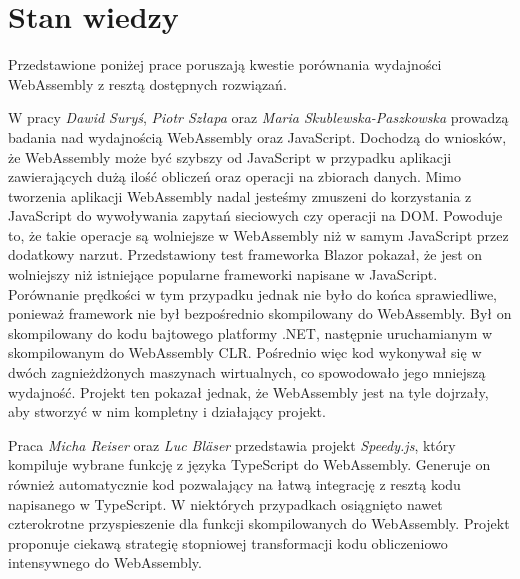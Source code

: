 \documentclass[language=polish,type=master]{aghmodern}
\begin{document}
\section{Stan wiedzy}
Przedstawione poniżej prace poruszają kwestie porównania wydajności WebAssembly z resztą dostępnych rozwiązań.

W pracy \cite{wasm_blazor} \emph{Dawid Suryś}, \emph{Piotr Szłapa} oraz \emph{Maria Skublewska-Paszkowska} prowadzą badania nad wydajnością WebAssembly oraz JavaScript.
Dochodzą do wniosków, że WebAssembly może być szybszy od JavaScript w przypadku aplikacji zawierających dużą ilość obliczeń oraz operacji na zbiorach danych.
Mimo tworzenia aplikacji WebAssembly nadal jesteśmy zmuszeni do korzystania z JavaScript do wywoływania zapytań sieciowych czy operacji na DOM\footnotemark{}.
Powoduje to, że takie operacje są wolniejsze w WebAssembly niż w samym JavaScript przez dodatkowy narzut.
Przedstawiony test frameworka Blazor\footnotemark{} pokazał, że jest on wolniejszy niż istniejące popularne frameworki napisane w JavaScript.
Porównanie prędkości w tym przypadku jednak nie było do końca sprawiedliwe, ponieważ framework nie był bezpośrednio skompilowany do WebAssembly.
Był on skompilowany do kodu bajtowego platformy .NET, następnie uruchamianym w skompilowanym do WebAssembly CLR\footnotemark{}.
Pośrednio więc kod wykonywał się w dwóch zagnieżdżonych maszynach wirtualnych, co spowodowało jego mniejszą wydajność.
Projekt ten pokazał jednak, że WebAssembly jest na tyle dojrzały, aby stworzyć w nim kompletny i działający projekt.

Praca \cite{wasm_speedyjs} \emph{Micha Reiser} oraz \emph{Luc Bl\"{a}ser} przedstawia projekt \emph{Speedy.js}, który kompiluje wybrane funkcję z języka TypeScript\footnotemark{} do WebAssembly.
Generuje on również automatycznie kod pozwalający na łatwą integrację z resztą kodu napisanego w TypeScript.
W niektórych przypadkach osiągnięto nawet czterokrotne przyspieszenie dla funkcji skompilowanych do WebAssembly.
Projekt proponuje ciekawą strategię stopniowej transformacji kodu obliczeniowo intensywnego do WebAssembly.
\end{document}
